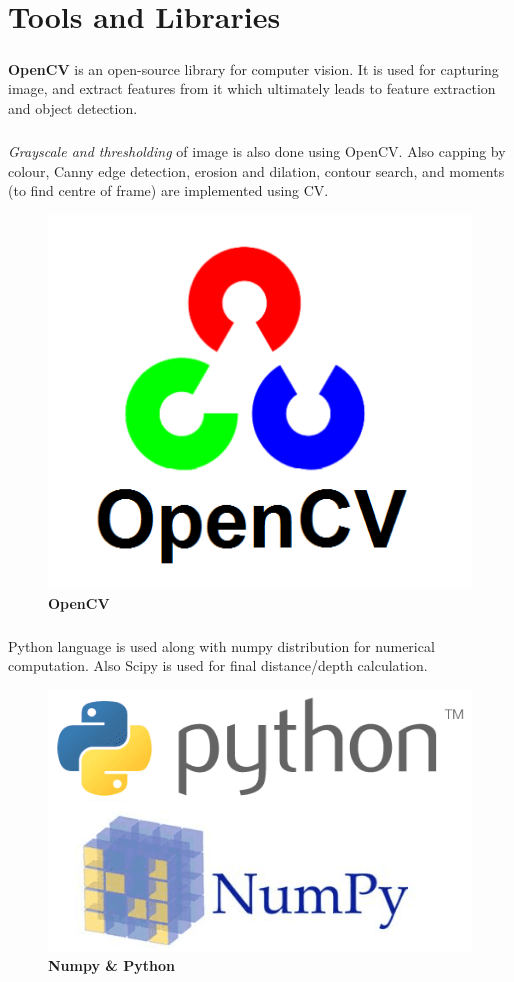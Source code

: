 \chapter{Tools and Libraries}
\paragraph{} \textbf{OpenCV} is an open-source library for computer vision. It is used for capturing image, and extract features from it which ultimately leads to feature extraction and object detection.
\paragraph{} \emph{Grayscale and thresholding} of image is also done using OpenCV. Also capping by colour, Canny edge detection, erosion and dilation, contour search, and moments (to find centre of frame) are implemented using CV.


\begin{figure}[H]
  \centering
    \includegraphics[scale=0.4]{project/images/cv}
  \caption{\textbf{OpenCV}}
\end{figure}

\paragraph{} Python language is used along with numpy distribution for numerical computation. Also Scipy is used for final distance/depth calculation.

\begin{figure}[H]
	\centering
	\includegraphics[scale=0.4]{project/images/py}
	\caption{\textbf{Numpy \& Python}}
\end{figure}


